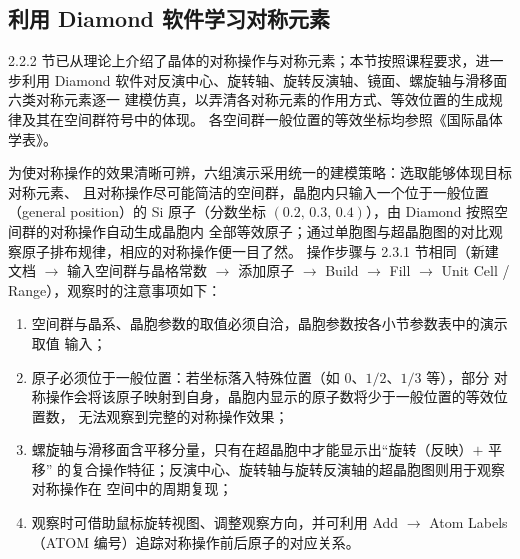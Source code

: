 \subsection{利用 Diamond 软件学习对称元素}

2.2.2 节已从理论上介绍了晶体的对称操作与对称元素；本节按照课程要求，进一步利用
Diamond 软件对反演中心、旋转轴、旋转反演轴、镜面、螺旋轴与滑移面六类对称元素逐一
建模仿真，以弄清各对称元素的作用方式、等效位置的生成规律及其在空间群符号中的体现。
各空间群一般位置的等效坐标均参照《国际晶体学表》\cite{hahn2002itt}。

为使对称操作的效果清晰可辨，六组演示采用统一的建模策略：选取能够体现目标对称元素、
且对称操作尽可能简洁的空间群，晶胞内只输入一个位于一般位置（general position）的
Si 原子（分数坐标 $(0.2,\,0.3,\,0.4)$），由 Diamond 按照空间群的对称操作自动生成晶胞内
全部等效原子；通过单胞图与超晶胞图的对比观察原子排布规律，相应的对称操作便一目了然。
操作步骤与 2.3.1 节相同（新建文档 $\to$ 输入空间群与晶格常数 $\to$ 添加原子
$\to$ Build $\to$ Fill $\to$ Unit Cell / Range），观察时的注意事项如下：

\begin{enumerate}[label=（\arabic*）]
  \item 空间群与晶系、晶胞参数的取值必须自洽，晶胞参数按各小节参数表中的演示取值
    输入；
  \item 原子必须位于一般位置：若坐标落入特殊位置（如 $0$、$1/2$、$1/3$ 等），部分
    对称操作会将该原子映射到自身，晶胞内显示的原子数将少于一般位置的等效位置数，
    无法观察到完整的对称操作效果；
  \item 螺旋轴与滑移面含平移分量，只有在超晶胞中才能显示出``旋转（反映）$+$ 平移''
    的复合操作特征；反演中心、旋转轴与旋转反演轴的超晶胞图则用于观察对称操作在
    空间中的周期复现；
  \item 观察时可借助鼠标旋转视图、调整观察方向，并可利用 Add $\to$ Atom Labels
    （ATOM 编号）追踪对称操作前后原子的对应关系。
\end{enumerate}
